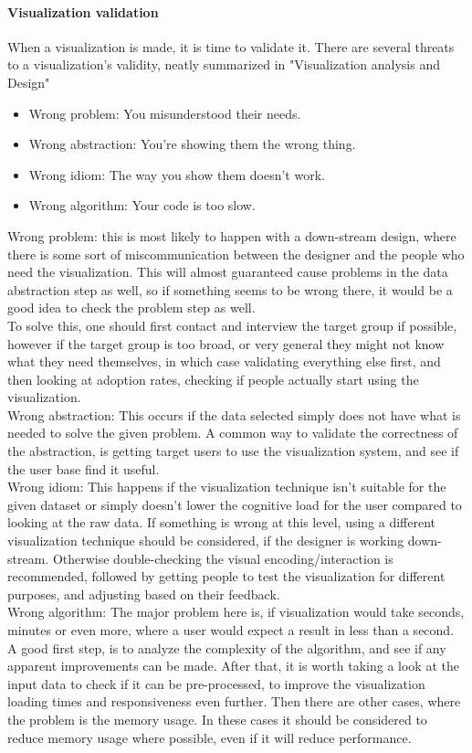 \documentclass[Report.tex]{subfiles}
\begin{document}
	\paragraph{Visualization validation\\}
	When a visualization is made, it is time to validate it. There are several threats to a visualization's validity, neatly summarized in "Visualization analysis and Design" \cite[75]{Tamara}
	\begin{itemize}
		\item Wrong problem: You misunderstood their needs.
		\item Wrong abstraction: You're showing them the wrong thing.
		\item Wrong idiom: The way you show them doesn't work.
		\item Wrong algorithm: Your code is too slow.
	\end{itemize}
	Wrong problem: this is most likely to happen with a down-stream design, where there is some sort of miscommunication between the designer and the people who need the visualization. This will almost guaranteed cause problems in the data abstraction step as well, so if something seems to be wrong there, it would be a good idea to check the problem step as well.\\
	To solve this, one should first contact and interview the target group if possible, however if the target group is too broad, or very general they might not know what they need themselves, in which case validating everything else first, and then looking at adoption rates, checking if people actually start using the visualization.\\
	Wrong abstraction: This occurs if the data selected simply does not have what is needed to solve the given problem. A common way to validate the correctness of the abstraction, is getting target users to use the visualization system, and see if the user base find it useful.\\
	 Wrong idiom: This happens if the visualization technique isn't suitable for the given dataset or simply doesn't lower the cognitive load for the user compared to looking at the raw data. If something is wrong at this level, using a different visualization technique should be considered, if the designer is working down-stream. Otherwise double-checking the visual encoding/interaction is recommended, followed by getting people to test the visualization for different purposes, and adjusting based on their feedback.\\
	 Wrong algorithm: The major problem here is, if visualization would take seconds, minutes or even more, where a user would expect a result in less than a second. \\
	 A good first step, is to analyze the complexity of the algorithm, and see if any apparent improvements can be made. After that, it is worth taking a look at the input data to check if it can be pre-processed, to improve the visualization loading times and responsiveness even further. Then there are other cases, where the problem is the memory usage. In these cases it should be considered to reduce memory usage where possible, even if it will reduce performance.
\end{document}
